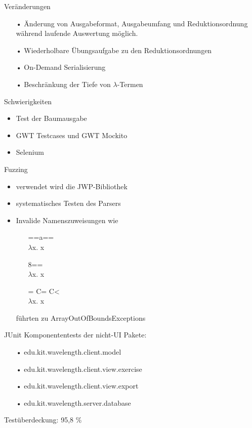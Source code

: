 \documentclass[10pt]{beamer}
\begin{document}
\begin{frame}{Veränderungen}
\begin{itemize}
	\item[•] Änderung von Ausgabeformat, Ausgabeumfang und Reduktionsordnung während laufende Auswertung möglich.
	\item[•] Wiederholbare Übungsaufgabe zu den Reduktionsordnungen
	\item[•] On-Demand Serialisierung
	\item[•] Beschränkung der Tiefe von $\lambda$-Termen
\end{itemize}
\end{frame}

\begin{frame}{Schwierigkeiten}
\begin{itemize}
	\setlength{\itemsep}{10pt}
	\item Test der Baumausgabe
	\item GWT Testcases und GWT Mockito 
	\item Selenium
\end{itemize}
\end{frame}

\begin{frame}{Fuzzing} %
\begin{itemize} 
	\item verwendet wird die JWP-Bibliothek
	\item systematisches Testen des Parsers
	\newline
	\item Invalide Namenszuweisungen wie
	\begin{multicols}{3}
	\begin{itemize}
		\item[] ==a== \\ $\lambda$x. x
		\item[] 8== \\ $\lambda$x. x
		\item[] = C= C< \\ $\lambda$x. x
	\end{itemize}
	\end{multicols}
	führten zu ArrayOutOfBoundsExceptions
\end{itemize}
\end{frame}

\begin{frame}{JUnit}
Komponententests der nicht-UI Pakete:
\begin{itemize}
	\item[•] edu.kit.wavelength.client.model
	\item[•] edu.kit.wavelength.client.view.exercise
	\item[•] edu.kit.wavelength.client.view.export
	\item[•] edu.kit.wavelength.server.database
\end{itemize}
Testüberdeckung: 95,8 \%
\end{frame}
\end{document}
